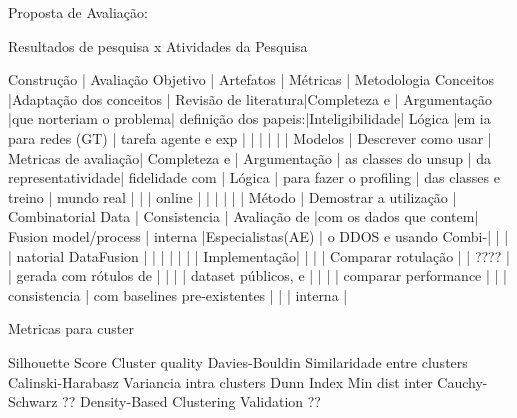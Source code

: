 Proposta de Avaliação:


                        Resultados de pesquisa x Atividades da Pesquisa
                        
                               Construção                    |           Avaliação
                        Objetivo      |    Artefatos         |    Métricas    |   Metodologia
Conceitos    |Adaptação dos conceitos | Revisão de literatura|Completeza e    |  Argumentação
             |que norteriam o problema| definição dos papeis:|Inteligibilidade|     Lógica
             |em ia para redes (GT)   | tarefa agente e exp  |                |
             |                        |                      |                |
Modelos      | Descrever como usar    | Metricas de avaliação| Completeza e   | Argumentação
             | as classes do unsup    | da representatividade| fidelidade com |     Lógica
             | para fazer o profiling | das classes e treino | mundo real     |
             |                        | online               |                |
             |                        |                      |                |
Método       | Demostrar a utilização | Combinatorial Data   | Consistencia   | Avaliação de  
             |com os dados que contem| Fusion model/process  |  interna       |Especialistas(AE)
             | o DDOS e usando  Combi-|                      |                |
             |  natorial DataFusion   |                      |                |
             |                        |                      |                |
Implementação|                        |                      |                | Comparar rotulação
             |                        |    ????              |                | gerada com rótulos de           
             |                        |                      |                | dataset públicos, e
             |                        |                      |                | comparar performance
             |                        |                      |  consistencia  | com baselines pre-existentes
             |                        |                      |     interna    | 


Metricas para custer

Silhouette Score	Cluster quality 
Davies-Bouldin		Similaridade entre clusters
Calinski-Harabasz	Variancia  intra clusters
Dunn Index	    	Min dist inter 
Cauchy-Schwarz         ??
Density-Based Clustering Validation ??